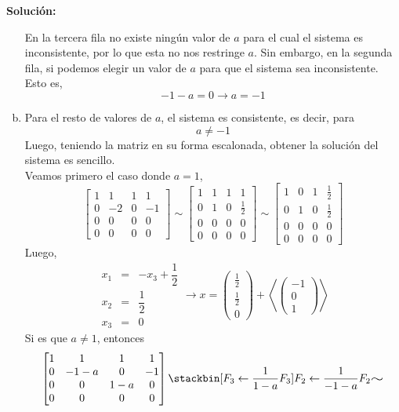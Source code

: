 \documentclass[12pt]{article}
\newenvironment{solucion}
{\begin{mdframed}[backgroundcolor=black!10]
		{\bf Solución:}\\
	}
	{
	\end{mdframed}
}
\newenvironment{preguntas}
{\begin{enumerate}\itemsep12pt
	}
	{
	\end{enumerate}
}
\newcommand{\ra}{\rightarrow}
\newcommand{\widesim}[2][1.5]{
	\mathrel{\overset{#2}{\scalebox{#1}[1]{$\sim$}}}
}
\newcommand{\wsim}{\widesim{}}
\begin{document}
\begin{preguntas}
\begin{solucion}
\begin{enumerate}[a)]
En la tercera fila no existe ningún valor de $a$ para el cual el sistema es inconsistente, por lo que esta no nos restringe $a$.
Sin embargo, en la segunda fila, si podemos elegir un valor de $a$ para que el sistema sea inconsistente. Esto es,
$$-1-a = 0 \ra a = -1$$
\item Para el resto de valores de $a$, el sistema es consistente, es decir, para
$$a \neq -1$$
Luego, teniendo la matriz en su forma escalonada, obtener la solución del sistema es sencillo.\\
Veamos primero el caso donde $a=1$,
$$\begin{bmatrix}
1 & 1 & 1 & 1\\
0 &-2 & 0 & -1\\
0 & 0 & 0 & 0\\
0 & 0 & 0 & 0
\end{bmatrix} \sim
\begin{bmatrix}
1 & 1 & 1 & 1\\
0 & 1 & 0 & \frac{1}{2}\\
0 & 0 & 0 & 0\\
0 & 0 & 0 & 0
\end{bmatrix} \sim
\begin{bmatrix}
1 & 0 & 1 & \frac{1}{2}\\
0 & 1 & 0 & \frac{1}{2}\\
0 & 0 & 0 & 0\\
0 & 0 & 0 & 0
\end{bmatrix} $$
Luego,
$$\begin{array}{rcl}
x_1 & = & -x_3 + \dfrac{1}{2}\\
x_2 & = & \dfrac{1}{2}\\
x_3 & = & 0 
\end{array} \ra 
x = \begin{pmatrix}
\frac{1}{2} \\
\frac{1}{2} \\
0
\end{pmatrix} + \left<\begin{pmatrix}
-1\\0\\1
\end{pmatrix}\right>$$
Si es que $a \neq 1$, entonces
$$\begin{bmatrix}
1 & 1 & 1 & 1\\
0 &-1-a & 0 & -1\\
0 & 0 & 1-a & 0\\
0 & 0 & 0 & 0
\end{bmatrix}
\stackbin[F_3 \leftarrow \frac{1}{1-a}F_3]{F_2 \leftarrow \frac{1}{-1-a}F_2}{\wsim}
$$
\end{enumerate}
\end{solucion}
\end{preguntas}
\end{document}
